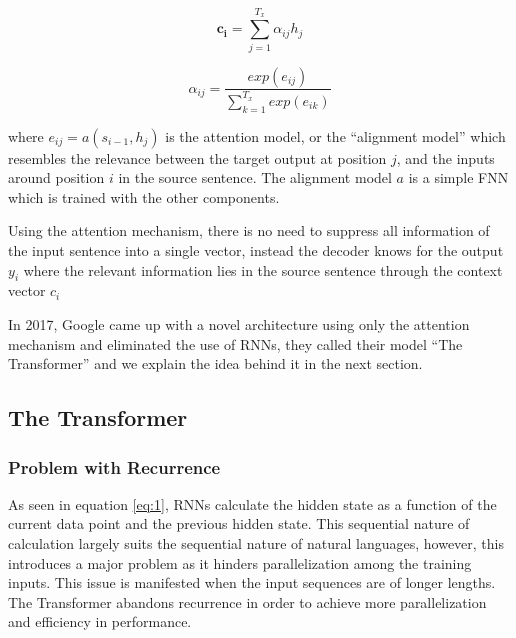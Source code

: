 \begin{equation}
\label{eq:22}
\mathbf{c_i} = \sum_{j=1}^{T_x} \alpha_{ij} h_j
\end{equation}

\begin{equation}
\label{eq:23}
\alpha_{ij} = \frac{ exp(e_{ij}) }{ \sum_{k=1}^{T_x} exp(e_{ik}) }
\end{equation}

where $e_{ij} = a(s_{i-1}, h_j)$ is the attention model, or the \enquote{alignment model} which resembles the relevance between the target output at position $j$, and the inputs around position $i$ in the source sentence. The alignment model $a$ is a simple \ac{FNN} which is trained with the other components.

Using the attention mechanism, there is no need to suppress all information of the input sentence into a single vector, instead the decoder knows for the output $y_i$ where the relevant information lies in the source sentence through the context vector $c_i$


In 2017, Google came up with a novel architecture using only the attention mechanism and eliminated the use of \ac{RNN}s, they called their model \enquote{The Transformer} \cite{vaswani2017attention} and we explain the idea behind it in the next section.

\subsection{The Transformer} 
\label{bg:s4_sub3}


\subsubsection{Problem with Recurrence} 
\label{bg:s4_sub3_subsub1}

As seen in equation \ref{eq:1}, \ac{RNN}s calculate the hidden state as a function of the current data point and the previous hidden state. This sequential nature of calculation largely suits the sequential nature of natural languages, however, this introduces a major problem as it hinders parallelization among the training inputs. This issue is manifested when the input sequences are of longer lengths. The Transformer abandons recurrence in order to achieve more parallelization and efficiency in performance.




